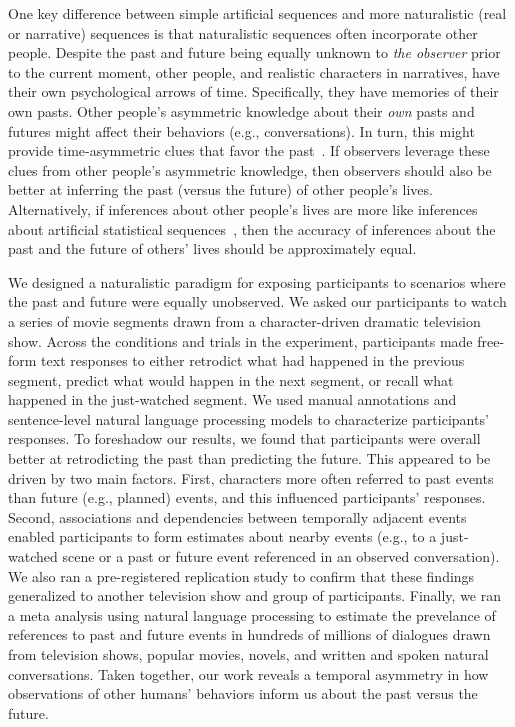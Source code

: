 \documentclass[10pt]{article}
\begin{document}
One key difference between simple artificial sequences and more naturalistic (real or narrative) sequences is that naturalistic sequences often incorporate other people.  Despite the past and future being equally unknown to \textit{the observer} prior to the current moment, other people, and realistic characters in narratives, have their own psychological arrows of time. Specifically, they have memories of their own pasts. Other people's asymmetric knowledge about their \textit{own} pasts and futures might affect their behaviors (e.g., conversations). In turn, this might provide time-asymmetric clues that favor the past~\citep[e.g., other people might talk more about their own pasts than their futures; ][]{DemiEtal18}. If observers leverage these clues from other people's asymmetric knowledge, then observers should also be better at inferring the past (versus the future) of other people's lives.  Alternatively, if inferences about other people's lives are more like inferences about artificial statistical sequences~\citep[e.g., perhaps solely relying on statistical regularities like event schemas, scripts, or situation models][]{RadvCope06, ZwaaRadv98, BoweEtal79, RangRitc12, BaldEtal18}, then the accuracy of inferences about the past and the future of others' lives should be approximately equal.

We designed a naturalistic paradigm for exposing participants to scenarios where the past and future were equally unobserved.  We asked our participants to watch a series of movie segments drawn from a character-driven dramatic television show.  Across the conditions and trials in the experiment, participants made free-form text responses to either retrodict what had happened in the previous segment, predict what would happen in the next segment, or recall what happened in the just-watched segment.  We used manual annotations and sentence-level natural language processing models to characterize participants' responses.  To foreshadow our results, we found that participants were overall better at retrodicting the past than predicting the future. This appeared to be driven by two main factors.  First, characters more often referred to past events than future (e.g., planned) events, and this influenced participants' responses. Second, associations and dependencies between temporally adjacent events enabled participants to form estimates about nearby events (e.g., to a just-watched scene or a past or future event referenced in an observed conversation).  We also ran a pre-registered replication study to confirm that these findings generalized to another television show and group of participants.  Finally, we ran a meta analysis using natural language processing to estimate the prevelance of references to past and future events in hundreds of millions of dialogues drawn from television shows, popular movies, novels, and written and spoken natural conversations.  Taken together, our work reveals a temporal asymmetry in how observations of other humans’ behaviors inform us about the past versus the future.
\end{document}
